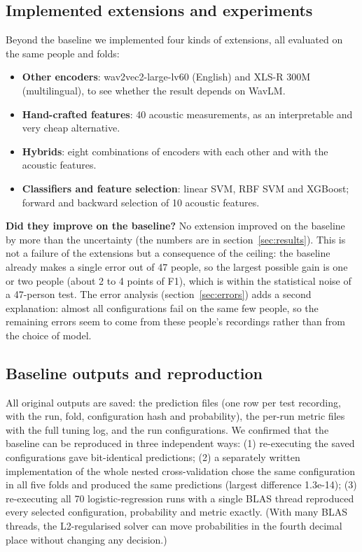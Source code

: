\documentclass[11pt,a4paper]{article}
\begin{document}
\subsection{Implemented extensions and experiments}\label{sec:extensions}
Beyond the baseline we implemented four kinds of extensions, all evaluated on the same people and folds:

\begin{itemize}\item \textbf{Other encoders}: wav2vec2-large-lv60 (English) and XLS-R 300M (multilingual), to see whether the result depends on WavLM.
\item \textbf{Hand-crafted features}: 40 acoustic measurements, as an interpretable and very cheap alternative.
\item \textbf{Hybrids}: eight combinations of encoders with each other and with the acoustic features.
\item \textbf{Classifiers and feature selection}: linear SVM, RBF SVM and XGBoost; forward and backward selection of 10 acoustic features.
\end{itemize}
\textbf{Did they improve on the baseline?} No extension improved on the baseline by more than the uncertainty (the numbers are in section~\ref{sec:results}). This is not a failure of the extensions but a consequence of the ceiling: the baseline already makes a single error out of 47 people, so the largest possible gain is one or two people (about 2 to 4 points of F1), which is within the statistical noise of a 47-person test. The error analysis (section~\ref{sec:errors}) adds a second explanation: almost all configurations fail on the same few people, so the remaining errors seem to come from these people's recordings rather than from the choice of model.

\subsection{Baseline outputs and reproduction}\label{sec:reproduction}
All original outputs are saved: the prediction files (one row per test recording, with the run, fold, configuration hash and probability), the per-run metric files with the full tuning log, and the run configurations. We confirmed that the baseline can be reproduced in three independent ways: (1) re-executing the saved configurations gave bit-identical predictions; (2) a separately written implementation of the whole nested cross-validation chose the same configuration in all five folds and produced the same predictions (largest difference 1.3e-14); (3) re-executing all 70 logistic-regression runs with a single BLAS thread reproduced every selected configuration, probability and metric exactly. (With many BLAS threads, the L2-regularised solver can move probabilities in the fourth decimal place without changing any decision.)
\end{document}
